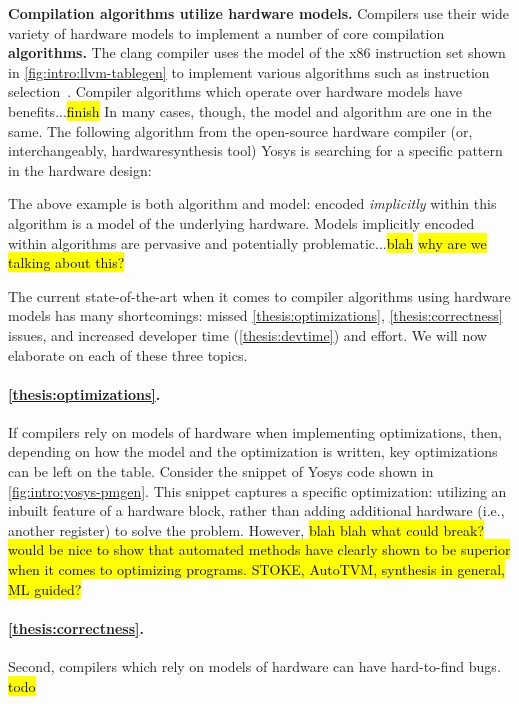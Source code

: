 \textbf{Compilation algorithms
  utilize hardware models.}
Compilers use their
  wide variety of
  hardware models
  to implement a number of core
  compilation
  \textbf{algorithms.}
The clang compiler uses 
  the model of the x86 instruction set
  shown in \cref{fig:intro:llvm-tablegen}
  to implement
  various algorithms
  such as instruction 
  selection~\cite{llvminstructionselection}.
Compiler algorithms
  which operate over hardware models
  have benefits...\hl{finish}
In many cases, though,
  the model and algorithm are 
  one in the same.
The following algorithm
  from the open-source hardware compiler
  (or, interchangeably,
    \gls{hardwaresynthesis} tool)
  Yosys
  is searching for a specific pattern 
  in the hardware design:



\noindent
The above example is both algorithm
  and model:
  encoded \textit{implicitly}
  within this algorithm
  is a model of the underlying hardware.
Models implicitly encoded within algorithms
  are pervasive and potentially problematic...\hl{blah}
\hl{why are we talking about this?}
  

The current state-of-the-art
  when it comes to compiler algorithms
  using hardware models
  has many shortcomings:
  missed
  \cref{thesis:optimizations},
  \cref{thesis:correctness}
  issues,
  and 
  increased developer time
  (\cref{thesis:devtime})
  and effort.
We will now
  elaborate on each of these three topics.

\paragraph{\cref{thesis:optimizations}.}
If compilers rely on models
  of hardware
  when implementing optimizations,
  then, depending on how the model
  and the optimization is written,
  key optimizations can be left on the table.
Consider the snippet of Yosys code
  shown in
  \cref{fig:intro:yosys-pmgen}.
This snippet captures a specific optimization:
  utilizing an inbuilt feature of a hardware block,
  rather than adding additional hardware
  (i.e., another register) to solve the problem.
However,
  \hl{blah blah what could break?}
\hl{would be nice to show that automated methods have clearly shown
  to be superior when it comes to optimizing programs.
  STOKE, AutoTVM, synthesis in general, ML guided?}

\paragraph{\cref{thesis:correctness}.}
Second, compilers
  which rely on models of hardware
  can have hard-to-find bugs.
\hl{todo}

